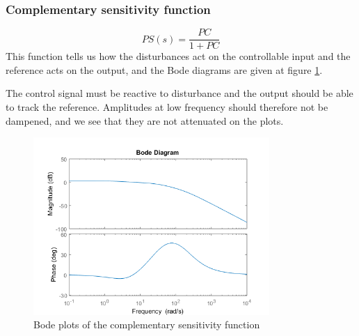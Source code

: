 \subsubsection{Complementary sensitivity function}
$$
PS(s) = \dfrac{PC}{1 + PC}
$$
This function tells us how the disturbances act on the controllable input and the reference acts on the output, and the Bode diagrams are given at figure \ref{fig:complementary-sensitivity}.\par
The control signal must be reactive to disturbance and the output should be able to track the reference. Amplitudes at low frequency should therefore not be dampened, and we see that they are not attenuated on the plots.
\begin{figure}[H]
    \centering
    \includegraphics[width=0.8\textwidth]{resources/png/complementary-sensitivity.png}
    \caption{Bode plots of the complementary sensitivity function}
    \label{fig:complementary-sensitivity}
\end{figure}

